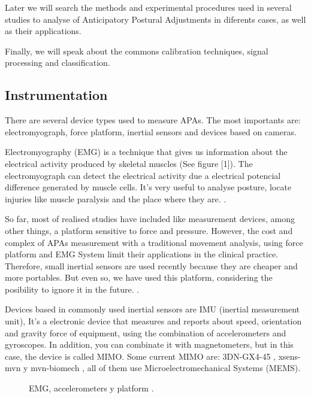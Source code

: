 Later we will search the methods and experimental procedures used in several studies to analyse of Anticipatory Postural Adjustments in diferents cases, as well as their applications.

Finally, we will speak about the commons calibration techniques, signal processing and classification.


\subsection{Instrumentation}

There are several  device types used to measure APAs. The most importants are: electromyograph, force platform, inertial sensors and devices based on cameras. 

Electromyography (EMG) is a technique that gives us information about the electrical activity produced by skeletal muscles (See figure [1]). The electromyograph can detect  the electrical activity due a electrical potencial difference generated by muscle cells. It’s very useful to analyse posture, locate injuries like muscle paralysis and the place where they are. \cite{Marcio2010} \cite{Instr1}. 


So far, most of realised studies have included like measurement devices, among other things, a platform sensitive to force and pressure. However, the cost and complex of APAs measurement with a traditional movement analysis, using force platform and EMG System limit their applications in the  clinical practice. Therefore, small inertial sensors are used recently because they are cheaper and more portables. But even so, we have used this platform, considering the posibility to ignore it in the future. \cite{Mancini2009} \cite{Vennila2011}.

Devices based in commonly used inertial sensors are IMU (inertial measurement unit), It’s a electronic device that measures and reports about speed, orientation and gravity force of equipment, using the combination of accelerometers and gyroscopes.
In addition, you can combinate it with magnetometers, but in this case, the device is called MIMO. Some current MIMO are: 3DN-GX4-45 \cite{Instr2},  xsens-mvn \cite{Instr3} y mvn-biomech \cite{Instr4}, all of them use Microelectromechanical Systems (MEMS).

\begin{figure}[H]
	\centering
	\caption{EMG, accelerometers y platform \cite{Gay2011}.}
	\label{fig:arte1}
\end{figure}

